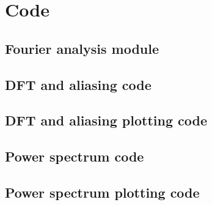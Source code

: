 \documentclass[twocolumn]{myarticle}
\begin{document}
\onecolumn

\section{Code}
\label{sec:code}

\subsection{Fourier analysis module}
\label{subsec:fourier_analysis_module}


\vspace{10pt}

\subsection{DFT and aliasing code}
\label{subsec:dft_and_aliasing_code}


\vspace{10pt}

\subsection{DFT and aliasing plotting code}
\label{subsec:dft_and_aliasing_plotting_code}


\vspace{10pt}

\subsection{Power spectrum code}
\label{subsec:power_spectrum_code}


\vspace{10pt}

\subsection{Power spectrum plotting code}
\label{subsec:power_spectrum_plotting_code}


\vspace{10pt}
\end{document}

